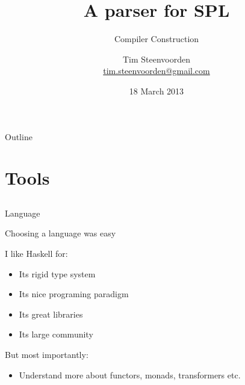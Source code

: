 \documentclass{beamer}
\newcommand{\SPL}
  {SPL}
\begin{document}
\subtitle {Compiler Construction}
\title    {A parser for \SPL}
\author   [Tim Steenvoorden]
          {Tim Steenvoorden\\
           \medskip
           {\small \url{tim.steenvoorden@gmail.com}}}%
\date     {18 March 2013}

\begin{frame}
  \titlepage
\end{frame}

\begin{frame}{Outline}
  \tableofcontents
\end{frame}

\section{Tools}
\subsection*{}

\begin{frame}{Language}
  
  Choosing a language was easy
  
  I like Haskell for:

  \begin{itemize}
    \item Its rigid type system
    \item Its nice programing paradigm
    \item Its great libraries
    \item Its large community
  \end{itemize}

  But most importantly:

  \begin{itemize}
    \item Understand more about functors, monads, transformers etc.
  \end{itemize}

\end{frame}
\end{document}
